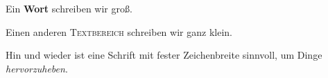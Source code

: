 \documentclass[a4paper,12pt]{article}
\begin{document}
Ein {\bfseries Wort} schreiben wir {\Huge groß}. 

Einen anderen {\scshape Textbereich} schreiben 
wir {\tiny ganz klein}.

Hin und wieder ist eine Schrift mit {\ttfamily fester 
Zeichenbreite} sinnvoll, um Dinge {\em hervorzuheben}.
\end{document}
